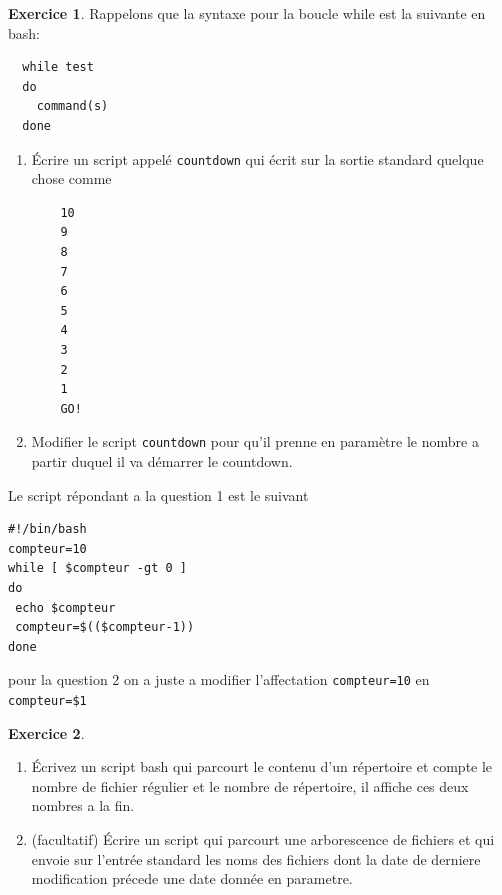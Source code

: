 \documentclass[a4paper,11pt]{article}
\theoremstyle{plain}
\theoremstyle{definition}
\newtheorem{exercice}{Exercice}
\begin{document}
\begin{exercice}
Rappelons que la syntaxe pour la boucle while est la suivante en bash:
\begin{verbatim}
  while test
  do
    command(s)
  done
\end{verbatim}
\begin{enumerate}
\item
\'Ecrire un script appelé \texttt{countdown} qui écrit sur la sortie standard quelque chose comme
\begin{verbatim}
    10
    9
    8
    7
    6
    5
    4
    3
    2
    1
    GO!
\end{verbatim}
\item Modifier le script \texttt{countdown} pour qu'il prenne en paramètre le nombre a partir duquel il va démarrer le countdown.
\end{enumerate}
\end{exercice}

\begin{correction}
Le script  répondant a la question 1 est le suivant
\begin{verbatim}
#!/bin/bash
compteur=10
while [ $compteur -gt 0 ]
do
 echo $compteur
 compteur=$(($compteur-1))
done
\end{verbatim}
pour la question 2 on a juste a modifier l'affectation \texttt{compteur=10} en \texttt{compteur=\$1}
\end{correction}

\begin{exercice}
\begin{enumerate}
\item \'Ecrivez un script bash qui parcourt le contenu d'un répertoire et compte le nombre de fichier régulier et le nombre de répertoire, il affiche ces deux nombres a la fin.
\item  (facultatif) \'Ecrire un script qui parcourt une arborescence de fichiers et qui envoie sur l'entrée standard  les noms  des fichiers dont la date de derniere modification précede une date donnée en parametre.
\end{enumerate}
\end{exercice}
\end{document}
